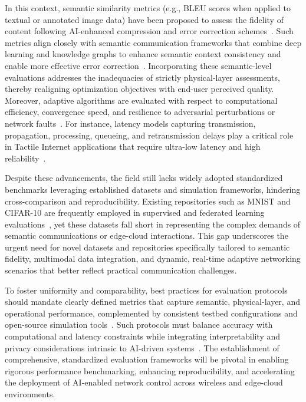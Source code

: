 \documentclass[sigconf]{acmart}
\begin{document}
In this context, semantic similarity metrics (e.g., BLEU scores when applied to textual or annotated image data) have been proposed to assess the fidelity of content following AI-enhanced compression and error correction schemes~\cite{ref1,ref3,ref50}. Such metrics align closely with semantic communication frameworks that combine deep learning and knowledge graphs to enhance semantic context consistency and enable more effective error correction~\cite{ref1}. Incorporating these semantic-level evaluations addresses the inadequacies of strictly physical-layer assessments, thereby realigning optimization objectives with end-user perceived quality. Moreover, adaptive algorithms are evaluated with respect to computational efficiency, convergence speed, and resilience to adversarial perturbations or network faults~\cite{ref5,ref7,ref10}. For instance, latency models capturing transmission, propagation, processing, queueing, and retransmission delays play a critical role in Tactile Internet applications that require ultra-low latency and high reliability~\cite{ref10}.

Despite these advancements, the field still lacks widely adopted standardized benchmarks leveraging established datasets and simulation frameworks, hindering cross-comparison and reproducibility. Existing repositories such as MNIST and CIFAR-10 are frequently employed in supervised and federated learning evaluations~\cite{ref5}, yet these datasets fall short in representing the complex demands of semantic communications or edge-cloud interactions. This gap underscores the urgent need for novel datasets and repositories specifically tailored to semantic fidelity, multimodal data integration, and dynamic, real-time adaptive networking scenarios that better reflect practical communication challenges.

To foster uniformity and comparability, best practices for evaluation protocols should mandate clearly defined metrics that capture semantic, physical-layer, and operational performance, complemented by consistent testbed configurations and open-source simulation tools~\cite{ref50}. Such protocols must balance accuracy with computational and latency constraints while integrating interpretability and privacy considerations intrinsic to AI-driven systems~\cite{ref7,ref50}. The establishment of comprehensive, standardized evaluation frameworks will be pivotal in enabling rigorous performance benchmarking, enhancing reproducibility, and accelerating the deployment of AI-enabled network control across wireless and edge-cloud environments.
\end{document}
